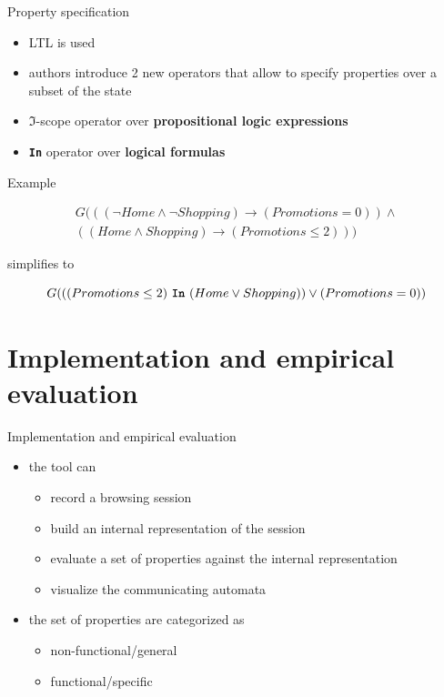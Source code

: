 \documentclass[usenames,dvipsnames]{beamer}
\theoremstyle{definition}
\begin{document}

\begin{frame}{Property specification}
  \begin{itemize}
    \item LTL is used
    \item authors introduce 2 new operators that allow to specify properties over a subset of the state
    \item $\mathcal{\Im}$-scope operator over \textbf{propositional logic expressions}
    \item \textbf{\texttt{In}} operator over \textbf{logical formulas}
  \end{itemize}
\end{frame}

\begin{frame}{Example}
  \begin{example}
    \begin{gather}
      G(((\neg Home\land\neg Shopping) \rightarrow (Promotions = 0)) \land \nonumber \\
      ((Home\land Shopping) \rightarrow (Promotions \leq 2))) \nonumber
    \end{gather}
  \end{example}

  simplifies to

  \begin{example}
    \label{example:in-operator-simple}
    $$
    G(((Promotions \leq 2)\ \textbf{\texttt{In}}\ (Home\lor Shopping))\lor(Promotions=0))
    $$
  \end{example}
\end{frame}

\section{Implementation and empirical evaluation}

\begin{frame}{Implementation and empirical evaluation}
  \begin{itemize}
    \item the tool can
      \begin{itemize}
        \item record a browsing session
        \item build an internal representation of the session
        \item evaluate a set of properties against the internal representation
        \item visualize the communicating automata
      \end{itemize}
    \item the set of properties are categorized as
      \begin{itemize}
        \item non-functional/general
        \item functional/specific
      \end{itemize}
  \end{itemize}
\end{frame}
\end{document}
